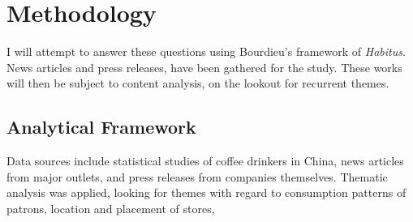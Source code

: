 \section{Methodology}\label{sec:methodology}

I will attempt to answer these questions using Bourdieu's framework of
\emph{Habitus}. News articles and press releases, have been gathered for the
study. These works will then be subject to content analysis, on the lookout for
recurrent themes.

\subsection{Analytical Framework}\label{subs:analyticf}

Data sources include statistical studies of coffee drinkers in China,
news articles from major outlets, and press releases from companies
themselves. Thematic analysis was applied, looking for themes with regard to
consumption patterns of patrons, location and placement of stores, 

